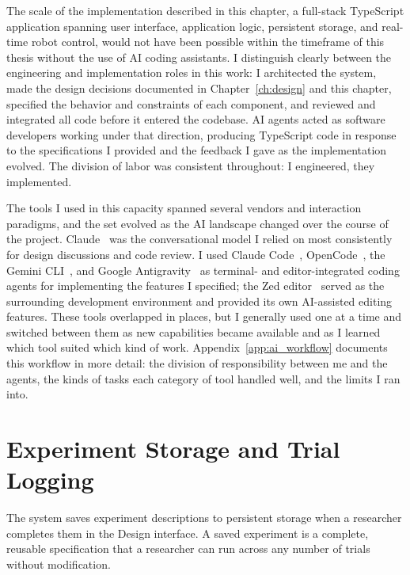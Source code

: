 The scale of the implementation described in this chapter, a full-stack TypeScript application spanning user interface, application logic, persistent storage, and real-time robot control, would not have been possible within the timeframe of this thesis without the use of AI coding assistants. I distinguish clearly between the engineering and implementation roles in this work: I architected the system, made the design decisions documented in Chapter~\ref{ch:design} and this chapter, specified the behavior and constraints of each component, and reviewed and integrated all code before it entered the codebase. AI agents acted as software developers working under that direction, producing TypeScript code in response to the specifications I provided and the feedback I gave as the implementation evolved. The division of labor was consistent throughout: I engineered, they implemented.

The tools I used in this capacity spanned several vendors and interaction paradigms, and the set evolved as the AI landscape changed over the course of the project. Claude~\cite{Anthropic2024Claude} was the conversational model I relied on most consistently for design discussions and code review. I used Claude Code~\cite{AnthropicClaudeCode}, OpenCode~\cite{OpenCode}, the Gemini CLI~\cite{GeminiCLI}, and Google Antigravity~\cite{GoogleAntigravity} as terminal- and editor-integrated coding agents for implementing the features I specified; the Zed editor~\cite{ZedEditor} served as the surrounding development environment and provided its own AI-assisted editing features. These tools overlapped in places, but I generally used one at a time and switched between them as new capabilities became available and as I learned which tool suited which kind of work. Appendix~\ref{app:ai_workflow} documents this workflow in more detail: the division of responsibility between me and the agents, the kinds of tasks each category of tool handled well, and the limits I ran into.

\section{Experiment Storage and Trial Logging}

The system saves experiment descriptions to persistent storage when a researcher completes them in the Design interface. A saved experiment is a complete, reusable specification that a researcher can run across any number of trials without modification.

